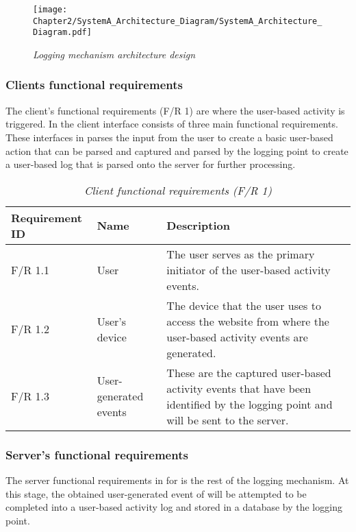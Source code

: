 \begin{figure}[!htb] %
	\centering %
	\texttt{[image: Chapter2/SystemA\_Architecture\_Diagram/SystemA\_Architecture\_Diagram.pdf]}
	\caption[Logging mechanism architecture design]
	{\textit{Logging mechanism architecture design}}\label{fig:ch2_systemDesign}
\end{figure}

\subsubsection{Clients functional requirements}
The client's functional requirements (F/R 1) are where the user-based activity is triggered. In  the client interface consists of three main functional requirements. These interfaces in  parses the input from the user to create a basic user-based action that can be parsed and captured and parsed by the logging point to create a user-based log that is parsed onto the server for further processing. 

\begin{table}[!htb]
	\centering
	\caption[Client functional requirements]
	{\textit{Client functional requirements (F/R 1)}}
	\label{tbl:ch2_clientFunctionalRequirements}
	\begin{tabularx}{\textwidth}{|l|l|X|}
		\hline \textbf{Requirement ID} & \textbf{Name} & \textbf{Description} \\
		\hline F/R 1.1 & User & The user serves as the primary initiator of the user-based activity events.\\
		\hline F/R 1.2 & User's device & The device that the user uses to access the website from where the user-based activity events are generated.\\
		\hline F/R 1.3 & User-generated events & These are the captured user-based activity events that have been identified by the logging point and will be sent to the server.\\
		\hline
	\end{tabularx}
\end{table}

\subsubsection{Server's functional requirements}\label{sec:ch2_serverFunctionalRequirements}
The server functional requirements in  for  is the rest of the logging mechanism. At this stage, the obtained user-generated event of  will be attempted to be completed into a user-based activity log and stored in a database by the logging point. \par 

